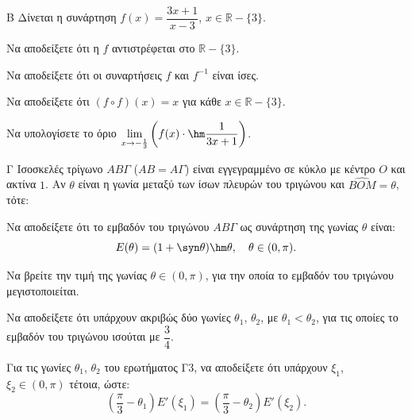 \begin{thema}{Β}
Δίνεται η συνάρτηση $f(x) = \dfrac{3x+1}{x-3}$, $x \in \mathbb{R} - \{3\}$.
\begin{erwthma}
    \item Να αποδείξετε ότι η $f$ αντιστρέφεται στο $\mathbb{R} - \{3\}$. 

    \item Να αποδείξετε ότι οι συναρτήσεις $f$ και $f^{-1}$ είναι ίσες. 

    \item Να αποδείξετε ότι $(f \circ f)(x) = x$ για κάθε $x \in \mathbb{R} - \{3\}$. 

    \item Να υπολογίσετε το όριο $\displaystyle\lim_{x \to -\frac{1}{3}} \left( f(x) \cdot \hm\dfrac{1}{3x+1} \right)$. 
\end{erwthma}
\end{thema}

\begin{thema}{Γ}
Ισοσκελές τρίγωνο $AB\Gamma$ ($AB = A\Gamma$) είναι εγγεγραμμένο σε κύκλο με κέντρο $O$ και ακτίνα $1$. Αν $\theta$ είναι η γωνία μεταξύ των ίσων πλευρών του τριγώνου και $\widehat{BOM} = \theta$, τότε:
\begin{erwthma}
    \item Να αποδείξετε ότι το εμβαδόν του τριγώνου $AB\Gamma$ ως συνάρτηση της γωνίας $\theta$ είναι:
    \[
    E(\theta) = (1 + \syn\theta)\hm\theta, \quad \theta \in (0, \pi).
    \]

    \item Να βρείτε την τιμή της γωνίας $\theta \in (0,\pi)$, για την οποία το εμβαδόν του τριγώνου μεγιστοποιείται. 

    \item Να αποδείξετε ότι υπάρχουν ακριβώς δύο γωνίες $\theta_1$, $\theta_2$, με $\theta_1 < \theta_2$, για τις οποίες το εμβαδόν του τριγώνου ισούται με $\dfrac{3}{4}$. 

    \item Για τις γωνίες $\theta_1$, $\theta_2$ του ερωτήματος Γ3, να αποδείξετε ότι υπάρχουν $\xi_1$, $\xi_2 \in (0,\pi)$ τέτοια, ώστε:
    \[
    \left(\frac{\pi}{3} - \theta_1\right) E'(\xi_1) = \left(\frac{\pi}{3} - \theta_2\right) E'(\xi_2).
    \]
\end{erwthma}
\end{thema}

